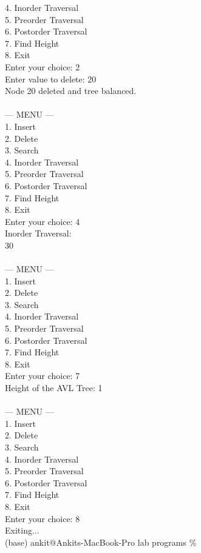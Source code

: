 \documentclass[12pt,a4paper]{article}
\begin{document}
\begin{tcolorbox}[terminalstyle, title=Sample Output]
{4. Inorder Traversal\\
5. Preorder Traversal\\
6. Postorder Traversal\\
7. Find Height\\
8. Exit\\
Enter your choice: 2\\
Enter value to delete: 20\\
Node 20 deleted and tree balanced.\\
\\
--- MENU ---\\
1. Insert\\
2. Delete\\
3. Search\\
4. Inorder Traversal\\
5. Preorder Traversal\\
6. Postorder Traversal\\
7. Find Height\\
8. Exit\\
Enter your choice: 4\\
Inorder Traversal:\\
30 \\
\\
--- MENU ---\\
1. Insert\\
2. Delete\\
3. Search\\
4. Inorder Traversal\\
5. Preorder Traversal\\
6. Postorder Traversal\\
7. Find Height\\
8. Exit\\
Enter your choice: 7\\
Height of the AVL Tree: 1\\
\\
--- MENU ---\\
1. Insert\\
2. Delete\\
3. Search\\
4. Inorder Traversal\\
5. Preorder Traversal\\
6. Postorder Traversal\\
7. Find Height\\
8. Exit\\
Enter your choice: 8\\
Exiting...\\
(base) ankit@Ankits-MacBook-Pro lab programs \%
}
\end{tcolorbox}
\end{document}
